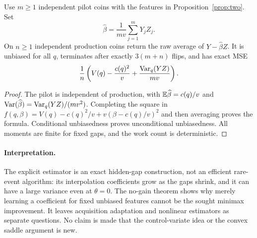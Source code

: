 \begin{proposition}
Use $m\ge1$ independent pilot coins with the features in
Proposition~\ref{prop:two}. Set
\[
 \widehat\beta=\frac1{mv}\sum_{j=1}^mY_jZ_j.
\]
On $n\ge1$ independent production coins return the raw average of
$Y-\widehat\beta Z$. It is unbiased for all $q$, terminates after exactly
$3(m+n)$ flips, and has exact MSE
\[
 \frac1n\left(V(q)-\frac{c(q)^2}{v}
             +\frac{\operatorname{Var}_q(YZ)}{mv}\right).
\]
\end{proposition}

\begin{proof}
The pilot is independent of production, with
$\mathbb E\widehat\beta=c(q)/v$ and
$\operatorname{Var}(\widehat\beta)=\operatorname{Var}_q(YZ)/(mv^2)$. Completing the square in
$f(q,\beta)=V(q)-c(q)^2/v+v(\beta-c(q)/v)^2$ and then averaging proves
the formula. Conditional unbiasedness proves unconditional unbiasedness.
All moments are finite for fixed gaps, and the work count is deterministic.
\end{proof}

\paragraph{Interpretation.}
The explicit estimator is an exact hidden-gap construction, not an efficient
rare-event algorithm: its interpolation coefficients grow as the gaps shrink,
and it can have a large variance even at $\theta=0$. The no-gain theorem
shows why merely learning a coefficient for fixed unbiased features cannot
be the sought minimax improvement. It leaves acquisition adaptation and
nonlinear estimators as separate questions. No claim is made that the
control-variate idea or the convex saddle argument is new.
